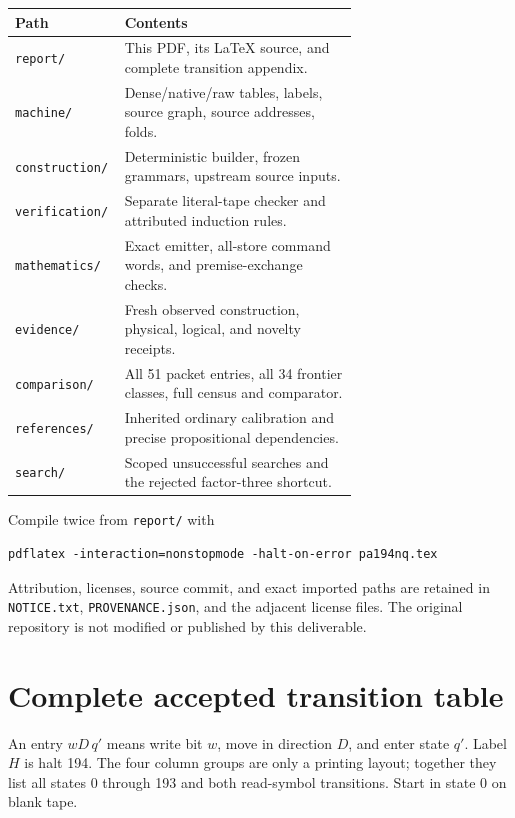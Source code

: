 \documentclass[10pt,letterpaper]{article}
\newcommand{\file}[1]{\nolinkurl{#1}}
\begin{document}
\begin{center}
\begin{tabular}{lp{0.68\linewidth}}
\toprule Path & Contents\\\midrule
\file{report/} & This PDF, its LaTeX source, and complete transition appendix.\\
\file{machine/} & Dense/native/raw tables, labels, source graph, source addresses, folds.\\
\file{construction/} & Deterministic builder, frozen grammars, upstream source inputs.\\
\file{verification/} & Separate literal-tape checker and attributed induction rules.\\
\file{mathematics/} & Exact emitter, all-store command words, and premise-exchange checks.\\
\file{evidence/} & Fresh observed construction, physical, logical, and novelty receipts.\\
\file{comparison/} & All 51 packet entries, all 34 frontier classes, full census and comparator.\\
\file{references/} & Inherited ordinary calibration and precise propositional dependencies.\\
\file{search/} & Scoped unsuccessful searches and the rejected factor-three shortcut.\\
\bottomrule
\end{tabular}
\end{center}

Compile twice from \file{report/} with
\begin{verbatim}
pdflatex -interaction=nonstopmode -halt-on-error pa194nq.tex
\end{verbatim}
Attribution, licenses, source commit, and exact imported paths are retained
in \file{NOTICE.txt}, \file{PROVENANCE.json}, and the adjacent license files.
The original repository is not modified or published by this deliverable.

\clearpage
\appendix
\section{Complete accepted transition table}

An entry \(wD\,q'\) means write bit \(w\), move in direction \(D\), and
enter state \(q'\). Label \(H\) is halt 194. The four column groups are
only a printing layout; together they list all states 0 through 193 and
both read-symbol transitions. Start in state 0 on blank tape.

\end{document}
